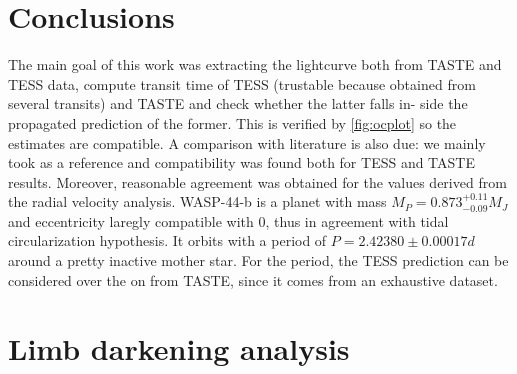 \documentclass[a4paper,11pt,twocolumn]{article}
\begin{document}
\newpage

\section{Conclusions}
The main goal of this work was extracting
the lightcurve both from TASTE and TESS
data, compute transit time of TESS (trustable
because obtained from several transits) and
TASTE and check whether the latter falls in-
side the propagated prediction of the former. 
This is verified by \ref{fig:ocplot} so the estimates are compatible.
A comparison with literature is also due: we 
mainly took \cite{Anderson} as a reference and 
compatibility was found both for TESS and TASTE 
results. Moreover, reasonable agreement was  
obtained for the values derived from the radial 
velocity analysis.
WASP-44-b is a planet with mass $M_P=0.873^{+0.11}_{-0.09}M_J$ 
and eccentricity laregly compatible with 0, thus 
in agreement with tidal circularization hypothesis.
It orbits with a period of $P=2.42380\pm0.00017d$ 
around a pretty inactive mother star. For the period, 
the TESS prediction can be considered over the on from 
TASTE, since it comes from an exhaustive dataset.









\nocite{*}
\printbibliography


\onecolumn

\appendix
\section{Limb darkening analysis}
\label{sect:app_A}
\end{document}
